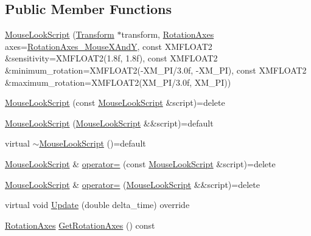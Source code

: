 \subsection*{Public Member Functions}
\begin{DoxyCompactItemize}
\item 
\hyperlink{classmage_1_1_mouse_look_script_a21944edcaaafae45d19e82ecbebbff7c}{Mouse\+Look\+Script} (\hyperlink{structmage_1_1_transform}{Transform} $\ast$transform, \hyperlink{namespacemage_a548e5c31b08a1078841ed21948f5bf4c}{Rotation\+Axes} axes=\hyperlink{namespacemage_a548e5c31b08a1078841ed21948f5bf4ca6b0dd5cb81f83efb4c2b36456d84750d}{Rotation\+Axes\+\_\+\+Mouse\+X\+AndY}, const X\+M\+F\+L\+O\+A\+T2 \&sensitivity=X\+M\+F\+L\+O\+A\+T2(1.\+8f, 1.\+8f), const X\+M\+F\+L\+O\+A\+T2 \&minimum\+\_\+rotation=\+X\+M\+F\+L\+O\+A\+T2(-\/\+X\+M\+\_\+\+P\+I/3.\+0f, -\/\+X\+M\+\_\+P\+I), const X\+M\+F\+L\+O\+A\+T2 \&maximum\+\_\+rotation=\+X\+M\+F\+L\+O\+A\+T2(\+X\+M\+\_\+\+P\+I/3.\+0f, X\+M\+\_\+P\+I))
\item 
\hyperlink{classmage_1_1_mouse_look_script_a54bd09419068ab61c4dd6fda412771d3}{Mouse\+Look\+Script} (const \hyperlink{classmage_1_1_mouse_look_script}{Mouse\+Look\+Script} \&script)=delete
\item 
\hyperlink{classmage_1_1_mouse_look_script_ab922490b99932e26d27e256a71db9905}{Mouse\+Look\+Script} (\hyperlink{classmage_1_1_mouse_look_script}{Mouse\+Look\+Script} \&\&script)=default
\item 
virtual \hyperlink{classmage_1_1_mouse_look_script_afe4592321c71e9e64a9f355b1f9cd938}{$\sim$\+Mouse\+Look\+Script} ()=default
\item 
\hyperlink{classmage_1_1_mouse_look_script}{Mouse\+Look\+Script} \& \hyperlink{classmage_1_1_mouse_look_script_a13fba7e90bf10d24814e0a8cec25645e}{operator=} (const \hyperlink{classmage_1_1_mouse_look_script}{Mouse\+Look\+Script} \&script)=delete
\item 
\hyperlink{classmage_1_1_mouse_look_script}{Mouse\+Look\+Script} \& \hyperlink{classmage_1_1_mouse_look_script_a2754174f5595fa424471c631818dc2b6}{operator=} (\hyperlink{classmage_1_1_mouse_look_script}{Mouse\+Look\+Script} \&\&script)=delete
\item 
virtual void \hyperlink{classmage_1_1_mouse_look_script_a7962403a78c02b2fe64e8f06f6319312}{Update} (double delta\+\_\+time) override
\item 
\hyperlink{namespacemage_a548e5c31b08a1078841ed21948f5bf4c}{Rotation\+Axes} \hyperlink{classmage_1_1_mouse_look_script_ae7ca5fd8fcfa1fbe6654bae9abc0c5b7}{Get\+Rotation\+Axes} () const

\end{DoxyCompactItemize}
